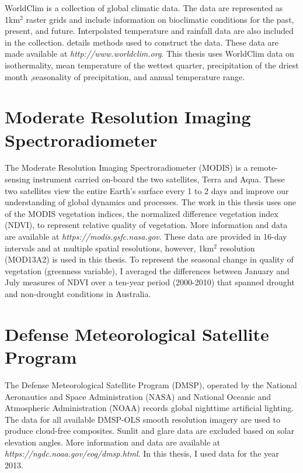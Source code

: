 WorldClim is a collection of global climatic data. The data are represented as 1km$^2$ raster grids and include information on bioclimatic conditions for the past, present, and future. Interpolated temperature and rainfall data are also included in the collection. \cite{hijm05} details methods used to construct the data. These data are made available at \textit{http://www.worldclim.org}. This thesis uses WorldClim data on isothermality, mean temperature of the wettest quarter, precipitation of the driest month ,seasonality of precipitation, and annual temperature range.

\section{Moderate Resolution Imaging Spectroradiometer}

The Moderate Resolution Imaging Spectroradiometer (MODIS) is a remote-sensing instrument carried on-board the two satellites, Terra and Aqua. These two satellites view the entire Earth's surface every 1 to 2 days and improve our understanding of global dynamics and processes. The work in this thesis uses one of the MODIS vegetation indices, the normalized difference vegetation index (NDVI), to represent relative quality of vegetation. More information and data are available at \textit{https://modis.gsfc.nasa.gov}. These data are provided in 16-day intervals and at multiple spatial resolutions, however, 1km$^2$ resolution (MOD13A2) is used in this thesis. To represent the seasonal change in quality of vegetation (greenness variable), I averaged the differences between January and July measures of NDVI over a ten-year period (2000-2010) that spanned drought and non-drought conditions in Australia.

\section{Defense Meteorological Satellite Program}

The Defense Meteorological Satellite Program (DMSP), operated by the National Aeronautics and Space Administration (NASA) and National Oceanic and Atmospheric Administration (NOAA) records global nighttime artificial lighting. The data for all available DMSP-OLS smooth resolution imagery are used to produce cloud-free composites. Sunlit and glare data are excluded based on solar elevation angles. More information and data are available at \textit{https://ngdc.noaa.gov/eog/dmsp.html}. In this thesis, I used data for the year 2013.

